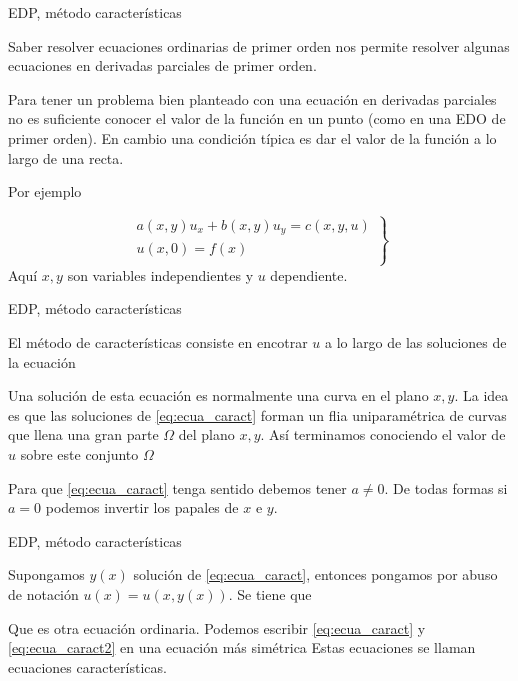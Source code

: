 \documentclass[handout,hyperref={colorlinks=true}]{beamer}
\renewcommand{\emph}[1]{\textcolor[rgb]{1,0,0}{#1}}
\begin{document}
\begin{frame}{EDP, método características}

\onslide<+->Saber resolver ecuaciones ordinarias de primer orden nos permite resolver algunas ecuaciones en derivadas parciales de primer orden. 

\onslide<+->Para tener un problema bien planteado con una ecuación en derivadas parciales no es suficiente conocer el valor de la función en un punto (como en una EDO de primer orden). En cambio una condición típica es dar el valor de la función a lo largo de una recta. 

\onslide<+-> Por ejemplo

\begin{equation}\label{eq:EDP_gral_1orden}
  \left.\begin{array}{l}
  a(x,y)u_x+b(x,y)u_y=c(x,y,u)\\
  u(x,0)=f(x)\\
\end{array}\right\}
\end{equation}
Aquí $x,y$ son variables independientes y $u$ dependiente.


 

\end{frame}

\begin{frame}{EDP, método características}

\onslide<+-> El método de características consiste en encotrar $u$ a lo largo de las soluciones de la ecuación


\onslide<+-> Una solución de esta ecuación es normalmente una curva en el plano  $x,y$. La idea es que las soluciones de \eqref{eq:ecua_caract} forman un flia uniparamétrica
 de curvas que llena una gran parte $\Omega$ del plano $x,y$.  Así terminamos conociendo el valor de $u$ sobre este conjunto $\Omega$ 

\onslide<+-> Para que \eqref{eq:ecua_caract} tenga sentido debemos tener $a\neq 0$. De todas formas si $a=0$ podemos invertir los papales de $x$ e $y$.
\end{frame}

\begin{frame}{EDP, método características}


\onslide<+-> Supongamos $y(x)$ solución de \eqref{eq:ecua_caract}, entonces pongamos por abuso de notación $u(x)=u(x,y(x))$. Se tiene que

Que es otra ecuación ordinaria. Podemos escribir  \eqref{eq:ecua_caract} y \eqref{eq:ecua_caract2} en una ecuación más simétrica
Estas ecuaciones se llaman \emph{ecuaciones características}.

\end{frame}
\end{document}
